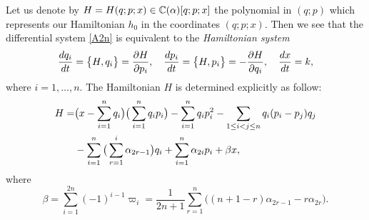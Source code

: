 Let us denote by $H=H(q;p;x)\in{\Bbb C}(\alpha)[q;p;x]$ the polynomial in $(q;p)$ which 
represents our Hamiltonian $h_0$ in the coordinates $(q;p;x)$. 
Then we see that the differential system \eqref{A2n} is equivalent to the 
{\em Hamiltonian system}
\begin{equation}
\frac{dq_i}{dt}=\big\{{ H,q_i }\big\}=\frac{\partial H}{\partial p_i},\quad
\frac{dp_i}{dt}=\big\{{ H,p_i }\big\}=-\frac{\partial H}{\partial q_i},\quad
\frac{dx}{dt}=k, 
\end{equation}
where $i=1,\ldots,n$. 
The Hamiltonian $H$ is determined explicitly as follow:
\begin{equation}\Label{H2n}
\begin{align}
H=& \big(x-\sum_{i=1}^n q_i \big) \big(\sum_{i=1}^n q_i p_i\big)
-\sum_{i=1}^n q_i p_i^2 
-\sum_{1\le i<j\le n}q_i(p_i-p_j)q_j \\
&
-\sum_{i=1}^n \big(\sum_{r=1}^i \alpha_{2r-1}\big) q_i+\sum_{i=1}^n \alpha_{2i} p_i
+\beta x,
\notag
\end{align}
\end{equation}
where
\begin{equation}
\beta=\sum_{i=1}^{2n}(-1)^{i-1}\varpi_i=
\frac{1}{2n+1}\sum_{r=1}^n \big((n+1-r)\alpha_{2r-1}-r\alpha_{2r}\big).
\end{equation}

